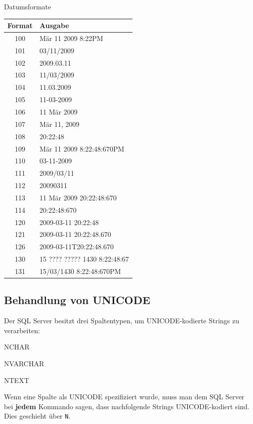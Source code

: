 \documentclass[12pt,ngerman,a4paper,index=totoc,twoside]{scrartcl}
\newcommand{\sql}[1]{\texttt{#1}}
\begin{document}
\begin{center}
\captionsetup{type=table}
\caption{Datumsformate}
\begin{tabular}{cp{5cm}} \\ \toprule
Format & Ausgabe \\ \midrule
100 & Mär 11 2009  8:22PM \\
101 & 03/11/2009    \\
102 & 2009.03.11    \\
103 & 11/03/2009   \\
104 & 11.03.2009   \\
105 & 11-03-2009   \\
106 & 11 Mär 2009  \\
107 & Mär 11, 2009    \\
108 & 20:22:48  \\
109 & Mär 11 2009  8:22:48:670PM  \\
110 & 03-11-2009  \\
111 & 2009/03/11   \\
112 & 20090311  \\
113 & 11 Mär 2009 20:22:48:670 \\
114 & 20:22:48:670    \\
120 & 2009-03-11 20:22:48   \\
121 & 2009-03-11 20:22:48.670  \\
126 & 2009-03-11T20:22:48.670  \\
130 & 15 ???? ????? 1430  8:22:48:67 \\
131 & 15/03/1430  8:22:48:670PM  \\ \bottomrule
\end{tabular}
\end{center}


\subsection{Behandlung von UNICODE}

Der SQL Server besitzt drei Spaltentypen, um UNICODE-kodierte Strings zu verarbeiten:

\begin{compactitem}
 \item NCHAR \index{}
 \item NVARCHAR \index{}
 \item NTEXT \index{}
\end{compactitem}

Wenn eine Spalte als UNICODE spezifiziert wurde, muss man dem SQL Server bei \textbf{jedem} Kommando sagen, dass nachfolgende Strings UNICODE-kodiert sind. Dies geschieht über \sql{N}.
\end{document}
